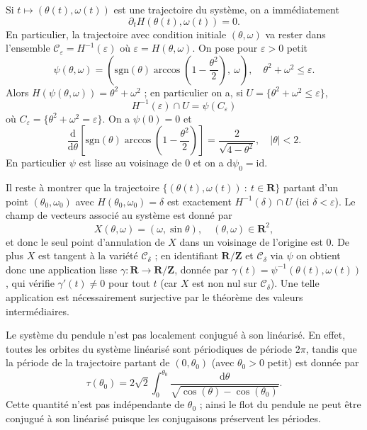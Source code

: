 \documentclass[a4paper,12pt,openany]{article}
\theoremstyle{plain}
\theoremstyle{definition}
\newcommand{\dd}{\mathrm{d}}
\newcommand{\R}{\mathbf{R}}
\newcommand{\Z}{\mathbf{Z}}
\newcommand{\id}{\mathrm{id}}
\begin{document}
\vspace{0.6cm}


 \vspace{1.5mm} 

\noindent Si $t \mapsto (\theta(t), \omega(t))$ est une trajectoire du syst\`eme, on a imm\'ediatement
$$
\partial_t H(\theta(t), \omega(t)) =  0.
$$
En particulier, la trajectoire avec condition initiale $(\theta, \omega)$ va rester dans l'ensemble $\mathcal{C}_{\varepsilon} =  H^{-1}(\varepsilon)$ o\`u $\varepsilon = H(\theta, \omega)$. On pose pour $\varepsilon > 0$ petit
$$
\psi(\theta, \omega) = \left(\mathrm{sgn}(\theta)\arccos\left(1-\frac{\theta^2}{2}\right), ~\omega\right), \quad \theta^2 + \omega^2 \leq \varepsilon.
$$
Alors $H(\psi(\theta, \omega)) = \theta^2 + \omega^2$ ; en particulier on a, si $U = \{\theta^2 + \omega^2 \leq \varepsilon\}$,
$$
H^{-1}(\varepsilon)\cap U = \psi(C_\varepsilon)
$$
o\`u $C_\varepsilon = \{\theta^2 +\omega^2 = \varepsilon\}$. On a $\psi(0) = 0$ et
$$
\frac{\dd}{\dd \theta} \left[ \mathrm{sgn}(\theta) \arccos\left(1-\frac{\theta^2}{2}\right)\right] =  \frac{2}{\sqrt{4-\theta^2}}, \quad |\theta| < 2.
$$
En particulier $\psi$ est lisse au voisinage de $0$ et on a 
$
\dd \psi_0 = \id.
$

\vspace{0.2cm}
\noindent Il reste \`a montrer que la trajectoire $\{(\theta(t), \omega(t))~:~ t \in \R\}$ partant d'un point $(\theta_0, \omega_0)$ avec $H(\theta_0, \omega_0) = \delta$ est exactement $H^{-1}(\delta)\cap U$ (ici $\delta < \varepsilon$). Le champ de vecteurs associ\'e au syst\`eme est donn\'e par
$$
X(\theta, \omega) = (\omega, \sin \theta), \quad (\theta, \omega) \in \R^2,
$$
et donc le seul point d'annulation de $X$ dans un voisinage de l'origine est $0$. De plus $X$ est tangent \`a la vari\'et\'e $\mathcal{C}_\delta$ ; en identifiant $\R/\Z$ et $\mathcal{C}_\delta$ via $\psi$ on obtient donc une application lisse $\gamma : \R \to \R/\Z$, donn\'ee par $\gamma(t) = \psi^{-1}(\theta(t), \omega(t))$, qui v\'erifie $\gamma'(t) \neq 0$ pour tout $t$ (car $X$ est non nul sur $\mathcal{C}_\delta$). Une telle application est n\'ecessairement surjective par le th\'eor\`eme des valeurs interm\'ediaires.


\vspace{0.2cm}
\noindent Le syst\`eme du pendule n'est pas localement conjugu\'e \`a son lin\'earis\'e. En effet, toutes les orbites du syst\`eme lin\'earis\'e sont p\'eriodiques de p\'eriode $2\pi$, tandis que la p\'eriode de la trajectoire partant de $(0, \theta_0)$ (avec $\theta_0 > 0$ petit) est donn\'ee par
$$
\tau(\theta_0) = 2\sqrt{2} \int_0^{\theta_0} \frac{\dd \theta}{\sqrt{\cos(\theta) - \cos(\theta_0)}}.
$$
Cette quantit\'e n'est pas ind\'ependante de $\theta_0$ ; ainsi le flot du pendule ne peut \^etre conjugu\'e \`a son lin\'earis\'e puisque les conjugaisons pr\'eservent les p\'eriodes.

\iffalse
\partial_\omega H(\theta(t), \omega(t)) \partial_\theta H(\theta(t), \omega(t)) - \partial_\theta H(\theta(t), \omega(t))\partial_\omega H(\theta(t), \omega(t)) =
\fi

\vspace{0.6cm}
\end{document}
